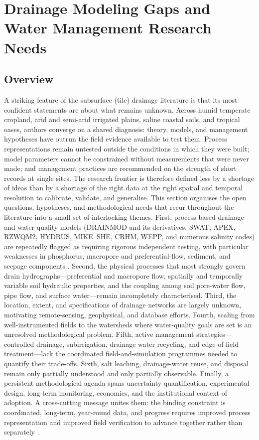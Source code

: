 \documentclass[11pt]{article}
\begin{document}
\section*{Drainage Modeling Gaps and Water Management Research Needs}

\subsection{Overview}

A striking feature of the subsurface (tile) drainage literature is that its
most confident statements are about what remains unknown. Across humid
temperate cropland, arid and semi-arid irrigated plains, saline coastal soils,
and tropical oases, authors converge on a shared diagnosis: theory, models,
and management hypotheses have outrun the field evidence available to test
them. Process representations remain untested outside the conditions in which
they were built; model parameters cannot be constrained without measurements
that were never made; and management practices are recommended on the strength
of short records at single sites. The research frontier is therefore defined
less by a shortage of ideas than by a shortage of the right data at the right
spatial and temporal resolution to calibrate, validate, and generalise. This
section organises the open questions, hypotheses, and methodological needs
that recur throughout the literature into a small set of interlocking themes.
First, process-based drainage and water-quality models (DRAINMOD and its
derivatives, SWAT, APEX, RZWQM2, HYDRUS, MIKE~SHE, CRHM, WEPP, and numerous
salinity codes) are repeatedly flagged as requiring rigorous independent
testing, with particular weaknesses in phosphorus, macropore and
preferential-flow, sediment, and seepage components
\parencite{Youssef2006,Askar2021b,Askar2025,Radcliffe2015,Williams2016}.
Second, the physical processes that most strongly govern drain
hydrographs---preferential and macropore flow, spatially and temporally
variable soil hydraulic properties, and the coupling among soil pore-water
flow, pipe flow, and surface water---remain incompletely characterised. Third,
the location, extent, and specifications of drainage networks are largely
unknown, motivating remote-sensing, geophysical, and database efforts. Fourth,
scaling from well-instrumented fields to the watersheds where water-quality
goals are set is an unresolved methodological problem. Fifth, active management
strategies---controlled drainage, subirrigation, drainage water recycling, and
edge-of-field treatment---lack the coordinated field-and-simulation programmes
needed to quantify their trade-offs. Sixth, salt leaching, drainage-water
reuse, and disposal remain only partially understood and only partially
observable. Finally, a persistent methodological agenda spans uncertainty
quantification, experimental design, long-term monitoring, economics, and the
institutional context of adoption. A cross-cutting message unites them: the
binding constraint is coordinated, long-term, year-round data, and progress
requires improved process representation and improved field verification to
advance together rather than separately
\parencite{Kladivko2001,Sharpley2019,Frankenberger2024,Schilling2008,Bauwe2016,Zhou2025}.
\end{document}
